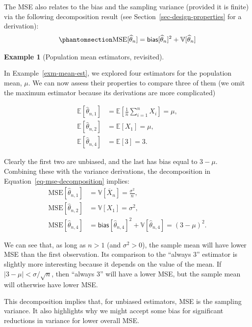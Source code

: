 \documentclass[
  13pt,
  letterpaper,
  DIV=11,
  numbers=noendperiod]{scrreprt}
\newcommand{\E}{\mathbb{E}}
\newcommand{\V}{\mathbb{V}}
\newcommand{\Xbar}{\overline{X}}
\theoremstyle{plain}
\theoremstyle{plain}
\theoremstyle{definition}
\theoremstyle{definition}
\newtheorem{example}{Example}[chapter]
\theoremstyle{remark}
\begin{document}
The MSE also relates to the bias and the sampling variance (provided it
is finite) via the following decomposition result (see
Section~\ref{sec-design-properties} for a derivation):
\begin{equation}\protect\phantomsection\label{eq-mse-decomposition}{
\text{MSE}[\widehat{\theta}_n] = \textsf{bias}[\widehat{\theta}_n]^2 + \V[\widehat{\theta}_n]
}\end{equation}

\begin{example}[Population mean estimators,
revisited]\protect\hypertarget{exm-mean-est-properties}{}\label{exm-mean-est-properties}

In Example~\ref{exm-mean-est}, we explored four estimators for the
population mean, \(\mu\). We can now assess their properties to compare
three of them (we omit the maximum estimator because its derivations are
more complicated)

\[
\begin{aligned}
\E[\widehat{\theta}_{n,1}] &= \E\left[\frac{1}{n} \sum_{i=1}^n X_i \right] = \mu, \\ 
\E[\widehat{\theta}_{n,2}] &= \E[X_1] = \mu, \\ 
\E[\widehat{\theta}_{n,4}] &= \E[3] = 3.
\end{aligned}
\]

Clearly the first two are unbiased, and the last has bias equal to
\(3 - \mu\). Combining these with the variance derivations, the
decomposition in Equation~\ref{eq-mse-decomposition} implies:
\[\begin{aligned}
\text{MSE}[\widehat{\theta}_{n,1}] &= \V[\Xbar_n] =  \frac{\sigma^2}{n}, \\ 
\text{MSE}[\widehat{\theta}_{n,2}] &= \V[X_1] = \sigma^2, \\ 
\text{MSE}[\widehat{\theta}_{n,4}] &= \textsf{bias}[\widehat{\theta}_{n,4}]^2 + \V[\widehat{\theta}_{n,4}] = (3- \mu)^2.
\end{aligned}
\]

We can see that, as long as \(n > 1\) (and \(\sigma^2 >0\)), the sample
mean will have lower MSE than the first observation. Its comparison to
the ``always 3'' estimator is slightly more interesting because it
depends on the value of the mean. If \(|3 - \mu| < \sigma/\sqrt{n}\),
then ``always 3'' will have a lower MSE, but the sample mean will
otherwise have lower MSE.

\end{example}

This decomposition implies that, for unbiased estimators, MSE is the
sampling variance. It also highlights why we might accept some bias for
significant reductions in variance for lower overall MSE.
\end{document}
